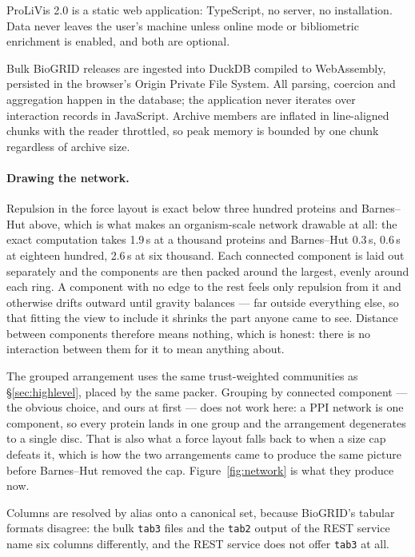 \documentclass[conference]{IEEEtran}
\begin{document}
ProLiVis 2.0 is a static web application: TypeScript, no server, no installation. Data
never leaves the user's machine unless online mode or bibliometric enrichment is
enabled, and both are optional.

Bulk BioGRID releases are ingested into DuckDB compiled to WebAssembly, persisted in the
browser's Origin Private File System. All parsing, coercion and aggregation happen in
the database; the application never iterates over interaction records in JavaScript.
Archive members are inflated in line-aligned chunks with the reader throttled, so peak
memory is bounded by one chunk regardless of archive size.


\paragraph{Drawing the network.} Repulsion in the force layout is exact below three
hundred proteins and Barnes--Hut above, which is what makes an organism-scale network
drawable at all: the exact computation takes 1.9\,s at a thousand proteins and
Barnes--Hut 0.3\,s, 0.6\,s at eighteen hundred, 2.6\,s at six thousand. Each connected
component is laid out separately and the components are then packed around the largest,
evenly around each ring. A component with no edge to the rest feels only repulsion from
it and otherwise drifts outward until gravity balances --- far outside everything else,
so that fitting the view to include it shrinks the part anyone came to see. Distance
between components therefore means nothing, which is honest: there is no interaction
between them for it to mean anything about.

The grouped arrangement uses the same trust-weighted communities as
\S\ref{sec:highlevel}, placed by the same packer. Grouping by connected component --- the
obvious choice, and ours at first --- does not work here: a PPI network is one component,
so every protein lands in one group and the arrangement degenerates to a single disc.
That is also what a force layout falls back to when a size cap defeats it, which is how
the two arrangements came to produce the same picture before Barnes--Hut removed the cap.
Figure~\ref{fig:network} is what they produce now.

Columns are resolved by alias onto a canonical set, because BioGRID's tabular formats
disagree: the bulk \texttt{tab3} files and the \texttt{tab2} output of the REST service
name six columns differently, and the REST service does not offer \texttt{tab3} at all.
\end{document}
